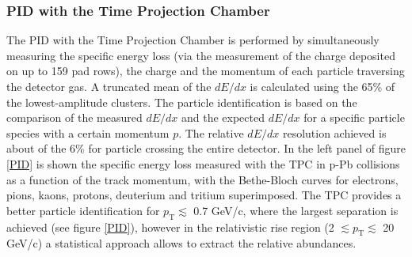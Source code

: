 \documentclass[b5paper,10pt,twoside,oldstyle,classica]{toptesi}
\newcommand{\pt}{p_\text{T}}
\begin{document}
\subsubsection{PID with the Time Projection Chamber}
The PID with the Time Projection Chamber is performed by simultaneously measuring the specific energy loss (via the measurement of the charge deposited on up to 159 pad rows), the charge and the momentum of each particle traversing the detector gas. A truncated mean of the $dE/dx$ is calculated using the 65\% of the lowest-amplitude clusters. The particle identification is based on the comparison of the measured $dE/dx$ and the expected $dE/dx$ for a specific particle species with a certain momentum $p$. The relative $dE/dx$ resolution achieved is about of the 6\% for particle crossing the entire detector. In the left panel of figure \ref{PID} is shown the specific energy loss measured with the TPC in p-Pb collisions as a function of the track momentum, with the Bethe-Bloch curves for electrons, pions, kaons, protons, deuterium and tritium superimposed.
The TPC provides a better particle identification for $\pt \lesssim$ 0.7 GeV/c, where the largest separation is achieved (see figure \ref{PID}), however in the relativistic rise region (2 $\lesssim \pt \lesssim$ 20 GeV/c) a statistical approach allows to extract the relative abundances.  
\end{document}
